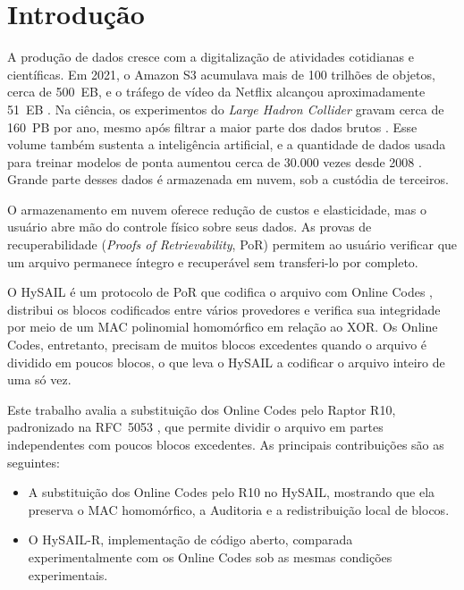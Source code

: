 \documentclass[portuguese]{sbc2025}%
\begin{document}
\section{Introdução}
\label{sec:intro}

A produção de dados cresce com a digitalização de atividades cotidianas e científicas. Em 2021, o Amazon S3 acumulava mais de 100 trilhões de objetos, cerca de 500~EB, e o tráfego de vídeo da Netflix alcançou aproximadamente 51~EB \citep{frontiersbigdata}. Na ciência, os experimentos do \emph{Large Hadron Collider} gravam cerca de 160~PB por ano, mesmo após filtrar a maior parte dos dados brutos \citep{frontiersbigdata}. Esse volume também sustenta a inteligência artificial, e a quantidade de dados usada para treinar modelos de ponta aumentou cerca de 30.000 vezes desde 2008 \citep{energyandai}. Grande parte desses dados é armazenada em nuvem, sob a custódia de terceiros.

O armazenamento em nuvem oferece redução de custos e elasticidade, mas o usuário abre mão do controle físico sobre seus dados. As provas de recuperabilidade (\emph{Proofs of Retrievability}, PoR) \citep{juels2007pors,shacham2008compact} permitem ao usuário verificar que um arquivo permanece íntegro e recuperável sem transferi-lo por completo.

O HySAIL \citep{amaral2019hysail} é um protocolo de PoR que codifica o arquivo com Online Codes \citep{maymounkov2002online}, distribui os blocos codificados entre vários provedores e verifica sua integridade por meio de um MAC polinomial homomórfico em relação ao XOR. Os Online Codes, entretanto, precisam de muitos blocos excedentes quando o arquivo é dividido em poucos blocos, o que leva o HySAIL a codificar o arquivo inteiro de uma só vez.

Este trabalho avalia a substituição dos Online Codes pelo Raptor R10, padronizado na RFC~5053 \citep{luby2007rfc5053}, que permite dividir o arquivo em partes independentes com poucos blocos excedentes. As principais contribuições são as seguintes:
\begin{itemize}
	\item A substituição dos Online Codes pelo R10 no HySAIL, mostrando que ela preserva o MAC homomórfico, a Auditoria e a redistribuição local de blocos.
	\item O HySAIL-R, implementação de código aberto, comparada experimentalmente com os Online Codes sob as mesmas condições experimentais.
\end{itemize}
\end{document}
